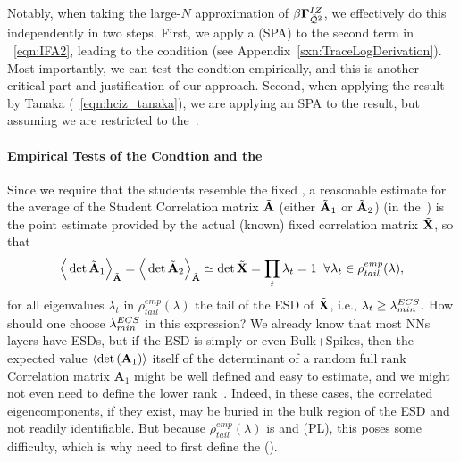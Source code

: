 Notably, when taking the large-$N$ approximation of $\beta\mathbf{\Gamma}^{IZ}_{\bar{\mathcal{Q}}^{2}}$, we effectively  do this independently in two steps.
First, we apply a \SaddlePointApproximation (SPA) to the second term in \EQN~\ref{eqn:IFA2},
leading to the \TRACELOG condition (see Appendix~\ref{sxn:TraceLogDerivation}).
Most importantly, we can test the \TRACELOG condtion empirically,
and this is another  critical part and justification of our \SETOL approach.
Second, when applying the result by Tanaka (\EQN~\ref{eqn:hciz_tanaka}),
we are applying an SPA to the result, but assuming we are
restricted to the~\ECS.


\paragraph{Empirical Tests of the \TRACELOG Condtion and the~\ECS}

Since we require that the students resemble the fixed \Teacher, a reasonable estimate for the average of the Student
Correlation matrix $\tilde{\mathbf{A}}$
(either $\tilde{\mathbf{A}}_{1}$ or $\tilde{\mathbf{A}}_{2}$)  (in the~\ECS)  is the point estimate provided by the actual (known) fixed \Teacher correlation matrix $\tilde{\mathbf{X}}$, so that
\begin{align}
\label{eqn:IFA-ppint}
\Big\langle \det\tilde{\mathbf{A}}_{1}\Big\rangle_{\tilde{\mathbf{A}}}=
\Big\langle \det\tilde{\mathbf{A}}_{2}\Big\rangle_{\tilde{\mathbf{A}}}
\simeq\det\tilde{\mathbf{X}}=\prod_{t}\lambda_{t}=1\;\;\forall\lambda_{t}\in\rho^{emp}_{tail}(\lambda) ,
\end{align}
for all eigenvalues $\lambda_{t}$ in $\rho^{emp}_{tail}(\lambda)$ the tail of the
ESD of $\tilde{\mathbf{X}}$, i.e., $\lambda_{t}\ge\lambda^{ECS}_{min}$.
%
How should one choose $\lambda^{ECS}_{min}$ in this expression?
We already know that most NNs layers have \FatTailed ESDs, but
if the \Teacher ESD is simply \emph{\RandomLike} or even Bulk+Spikes, then the expected value
$\langle\mbox{}{\text{det}}\left(\mathbf{A}_{1}\right)\rangle$ itself of the determinant
of a random full rank \Student Correlation matrix $\mathbf{A}_{1}$
might be well defined and easy to estimate, and we might not even need to define the lower rank~\ECS.
Indeed, in these cases, the correlated eigencomponents, if they exist, may be buried in the bulk
region of the ESD and not readily identifiable.
But because $\rho_{tail}^{emp}(\lambda)$ is \FatTailed
and \PowerLaw (PL), this poses some difficulty,
which is why need to first define the \EffectiveCorrelationSpace (\ECS).


